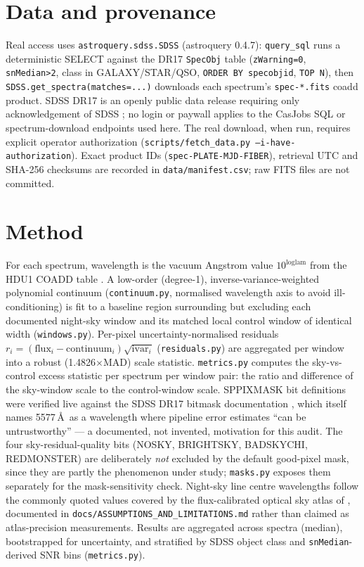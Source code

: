 \documentclass[11pt]{article}
\begin{document}
\section{Data and provenance}
\label{sec:data}
Real access uses \texttt{astroquery.sdss.SDSS} (astroquery 0.4.7):
\texttt{query\_sql} runs a deterministic SELECT against the DR17
\texttt{SpecObj} table (\texttt{zWarning=0}, \texttt{snMedian>2}, class in
GALAXY/STAR/QSO, \texttt{ORDER BY specobjid}, \texttt{TOP N}), then
\texttt{SDSS.get\_spectra(matches=...)} downloads each spectrum's
\texttt{spec-*.fits} coadd product. SDSS DR17 is an openly public data
release requiring only acknowledgement of SDSS
\citep{SDSSDr17SpectroBasics}; no login or paywall applies to the CasJobs
SQL or spectrum-download endpoints used here. The real download, when run,
requires explicit operator authorization
(\texttt{scripts/fetch\_data.py --i-have-authorization}). Exact product IDs
(\texttt{spec-PLATE-MJD-FIBER}), retrieval UTC and SHA-256 checksums are
recorded in \texttt{data/manifest.csv}; raw FITS files are not committed.

\section{Method}
For each spectrum, wavelength is the vacuum Angstrom value
$10^{\mathrm{loglam}}$ from the HDU1 COADD table
\citep{SDSSSpecDatamodel}. A low-order (degree-1), inverse-variance-weighted
polynomial continuum (\texttt{continuum.py}, normalised wavelength axis to
avoid ill-conditioning) is fit to a baseline region surrounding but
excluding each documented night-sky window and its matched local control
window of identical width (\texttt{windows.py}). Per-pixel
uncertainty-normalised residuals
$r_i = (\mathrm{flux}_i-\mathrm{continuum}_i)\sqrt{\mathrm{ivar}_i}$
(\texttt{residuals.py}) are aggregated per window into a robust
(1.4826$\times$MAD) scale statistic. \texttt{metrics.py} computes the
sky-vs-control excess statistic per spectrum per window pair: the ratio and
difference of the sky-window scale to the control-window scale. SPPIXMASK
bit definitions were verified live against the SDSS DR17 bitmask
documentation \citep{SDSSDr17Bitmasks}, which itself names 5577\,\AA\ as a
wavelength where pipeline error estimates ``can be untrustworthy'' --- a
documented, not invented, motivation for this audit. The four
sky-residual-quality bits (NOSKY, BRIGHTSKY, BADSKYCHI, REDMONSTER) are
deliberately \emph{not} excluded by the default good-pixel mask, since they
are partly the phenomenon under study; \texttt{masks.py} exposes them
separately for the mask-sensitivity check. Night-sky line centre
wavelengths follow the commonly quoted values covered by the flux-calibrated
optical sky atlas of \citet{Hanuschik2003SkyAtlas}, documented in
\texttt{docs/ASSUMPTIONS\_AND\_LIMITATIONS.md} rather than claimed as
atlas-precision measurements. Results are aggregated across spectra
(median), bootstrapped for uncertainty, and stratified by SDSS object class
and \texttt{snMedian}-derived SNR bins (\texttt{metrics.py}).
\end{document}
